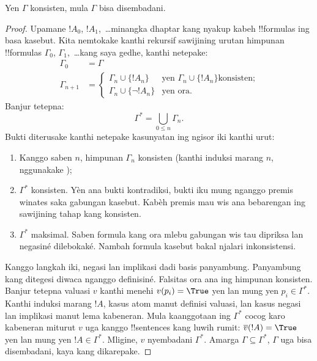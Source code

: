 \documentclass[../../../include/open-logic-section]{subfiles}
\begin{document}
\begin{thm}[Kajangkepan]
Yen $\Gamma$ konsisten, mula $\Gamma$ bisa disembadani.
\end{thm}

\begin{proof}
Upamane $!A_0$, $!A_1$,~\dots minangka dhaptar kang nyakup kabeh
!!{formula}s ing basa kasebut. Kita nemtokake kanthi rekursif sawijining
urutan himpunan !!{formula}s $\Gamma_0$, $\Gamma_1$,~\dots kang saya
gedhe, kanthi netepake:
\begin{align*}
\Gamma_0 & = \Gamma\\
\Gamma_{n+1} & =
\begin{cases}
  \Gamma_n \cup \{!A_n\} & \text{yen $\Gamma_n \cup \{!A_n\}$
    konsisten;}\\
  \Gamma_n \cup \{\lnot !A_n\} & \text{yen ora}.
\end{cases}
\end{align*}
Banjur tetepna:
\[
\Gamma^* = \bigcup_{0\le n}\Gamma_n.
\]
Bukti diterusake kanthi netepake kasunyatan ing ngisor iki kanthi urut:
\begin{enumerate}
\item Kanggo saben $n$, himpunan $\Gamma_n$ konsisten
  (kanthi induksi marang $n$, nggunakake );
\item $\Gamma^*$ konsisten. Yèn ana bukti kontradiksi, bukti
  iku mung nganggo premis winates saka gabungan kasebut. Kabèh
  premis mau wis ana bebarengan ing sawijining tahap kang konsisten.
\item $\Gamma^*$ maksimal. Saben formula kang ora mlebu gabungan
  wis tau dipriksa lan negasiné dilebokaké. Nambah formula kasebut
  bakal njalari inkonsistensi.
\end{enumerate}
Kanggo langkah iki, negasi lan implikasi dadi basis panyambung.
Panyambung kang ditegesi diwaca nganggo definisiné. Falsitas ora
ana ing himpunan konsisten. Banjur tetepna valuasi $v$ kanthi menehi $v(p_i) = \True$ yen lan
mung yen $p_i \in \Gamma^*$. Kanthi induksi marang $!A$, kasus atom manut definisi valuasi,
lan kasus negasi lan implikasi manut lema kabeneran. Mula
kaanggotaan ing $\Gamma^*$ cocog karo kabeneran miturut $v$
uga kanggo !!{sentence}s kang luwih rumit:
$\overline{v}(!A) = \True$ yen lan mung yen $!A \in \Gamma^*$.
Mligine, $v$ nyembadani $\Gamma^*$. Amarga $\Gamma \subseteq \Gamma^*$,
$\Gamma$ uga bisa disembadani, kaya kang dikarepake.
\end{proof}
\end{document}
